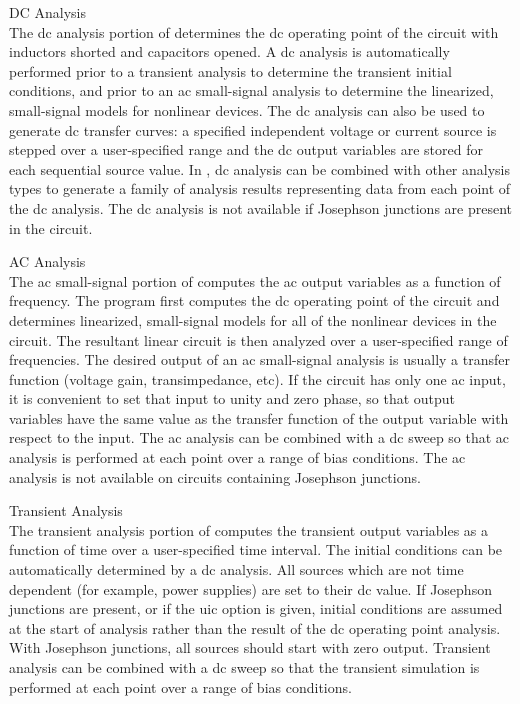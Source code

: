 \begin{description}
\item{DC Analysis}\\
The dc analysis portion of {\WRspice} determines the dc operating point
of the circuit with inductors shorted and capacitors opened.  A dc
analysis is automatically performed prior to a transient analysis to
determine the transient initial conditions, and prior to an ac
small-signal analysis to determine the linearized, small-signal models
for nonlinear devices.  The dc analysis can also be used to generate
dc transfer curves: a specified independent voltage or current source
is stepped over a user-specified range and the dc output variables are
stored for each sequential source value.  In {\WRspice}, dc analysis
can be combined with other analysis types to generate a family of analysis
results representing data from each point of the dc analysis.  The dc
analysis is not available if Josephson junctions are present in the
circuit.

\item{AC Analysis}\\
The ac small-signal portion of {\WRspice} computes the ac output
variables as a function of frequency.  The program first computes the
dc operating point of the circuit and determines linearized,
small-signal models for all of the nonlinear devices in the circuit.
The resultant linear circuit is then analyzed over a user-specified
range of frequencies.  The desired output of an ac small-signal
analysis is usually a transfer function (voltage gain, transimpedance,
etc).  If the circuit has only one ac input, it is convenient to set
that input to unity and zero phase, so that output variables have the
same value as the transfer function of the output variable with
respect to the input.  The ac analysis can be combined with a dc sweep
so that ac analysis is performed at each point over a range of bias
conditions.  The ac analysis is not available on circuits containing
Josephson junctions.

\item{Transient Analysis}\\
The transient analysis portion of {\WRspice} computes the transient
output variables as a function of time over a user-specified time
interval.  The initial conditions can be automatically determined by a
dc analysis.  All sources which are not time dependent (for example,
power supplies) are set to their dc value.  If Josephson junctions are
present, or if the {\vt uic} option is given, initial conditions are
assumed at the start of analysis rather than the result of the dc
operating point analysis.  With Josephson junctions, all sources
should start with zero output.  Transient analysis can be combined
with a dc sweep so that the transient simulation is performed at each
point over a range of bias conditions.


\end{description}
